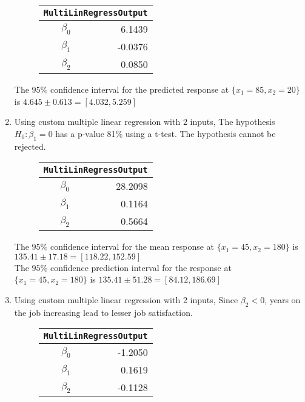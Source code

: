 \begin{enumerate}
\begin{figure}[H]
	\centering
	\begin{tabular}{@{}rr@{}}
		\toprule
		\multicolumn{2}{c}{\texttt{MultiLinRegressOutput}} \\
		\midrule
		$\beta_0$ &           6.1439 \\
		$\beta_1$ &          -0.0376 \\
		$\beta_2$ &           0.0850 \\
		\bottomrule
	\end{tabular}
	
\end{figure}

The $ 95\% $ confidence interval for the predicted response at $ \{x_1 = 85, x_2 = 20\} $ is
$ 4.645 \pm 0.613 = [4.032, 5.259]$ \\

\item Using custom multiple linear regression with 2 inputs,
The hypothesis $ H_0 : \beta_1 = 0$ has a p-value 81\% using a t-test. The hypothesis cannot be rejected.

\begin{figure}[H]
	\centering
	\begin{tabular}{@{}rr@{}}
		\toprule
		\multicolumn{2}{c}{\texttt{MultiLinRegressOutput}} \\
		\midrule
		$\beta_0$ &          28.2098 \\
		$\beta_1$ &           0.1164 \\
		$\beta_2$ &           0.5664 \\
		\bottomrule
	\end{tabular}
	
\end{figure}

The $ 95\% $ confidence interval for the mean response at $ \{x_1 = 45, x_2 = 180\} $ is
$ 135.41 \pm 17.18 = [118.22, 152.59]$ \\
The $ 95\% $ confidence prediction interval for the response at $ \{x_1 = 45, x_2 = 180\} $ is
$ 135.41 \pm 51.28 = [84.12, 186.69]$ \\


\item Using custom multiple linear regression with 2 inputs,
Since $ \beta_2  < 0$, years on the job increasing lead to lesser job satisfaction.

\begin{figure}[H]
	\centering
	\begin{tabular}{@{}rr@{}}
		\toprule
		\multicolumn{2}{c}{\texttt{MultiLinRegressOutput}} \\
		\midrule
		$\beta_0$ &          -1.2050 \\
		$\beta_1$ &           0.1619 \\
		$\beta_2$ &          -0.1128 \\
		\bottomrule
	\end{tabular}
	

\end{figure}
\end{enumerate}
